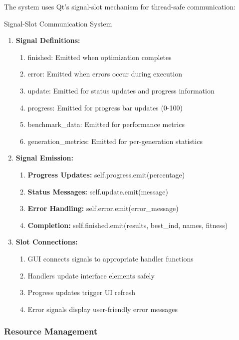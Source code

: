 \documentclass[12pt,a4paper]{article}
\begin{document}
The system uses Qt's signal-slot mechanism for thread-safe communication:

\begin{algorithm}
\caption{Signal-Slot Communication System}
\begin{enumerate}
    \item \textbf{Signal Definitions:}
    \begin{enumerate}
        \item finished: Emitted when optimization completes
        \item error: Emitted when errors occur during execution
        \item update: Emitted for status updates and progress information
        \item progress: Emitted for progress bar updates (0-100)
        \item benchmark\_data: Emitted for performance metrics
        \item generation\_metrics: Emitted for per-generation statistics
    \end{enumerate}
    \item \textbf{Signal Emission:}
    \begin{enumerate}
        \item \textbf{Progress Updates:} self.progress.emit(percentage)
        \item \textbf{Status Messages:} self.update.emit(message)
        \item \textbf{Error Handling:} self.error.emit(error\_message)
        \item \textbf{Completion:} self.finished.emit(results, best\_ind, names, fitness)
    \end{enumerate}
    \item \textbf{Slot Connections:}
    \begin{enumerate}
        \item GUI connects signals to appropriate handler functions
        \item Handlers update interface elements safely
        \item Progress updates trigger UI refresh
        \item Error signals display user-friendly error messages
    \end{enumerate}
\end{enumerate}
\end{algorithm}

\subsubsection{Resource Management}
\end{document}
